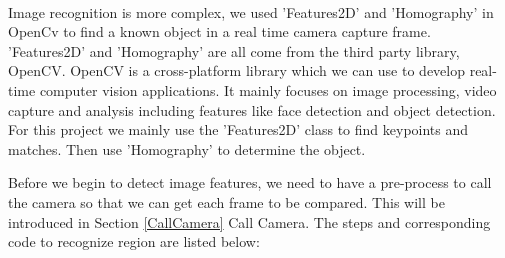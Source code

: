 \paragraph{}Image recognition is more complex, we used 'Features2D' and 'Homography' in OpenCv to find a known object in a real time camera capture frame. 'Features2D' and 'Homography' are all come from the third party library, OpenCV. OpenCV is a cross-platform library which we can use to develop real-time computer vision applications. It mainly focuses on image processing, video capture and analysis including features like face detection and object detection. For this project we mainly use the 'Features2D' class to find keypoints and matches. Then use 'Homography' to determine the object.
\par Before we begin to detect image features, we need to have a pre-process to call the camera so that we can get each frame to be compared. This will be introduced in Section \ref{CallCamera} Call Camera. The steps and corresponding code to recognize region are listed below:
